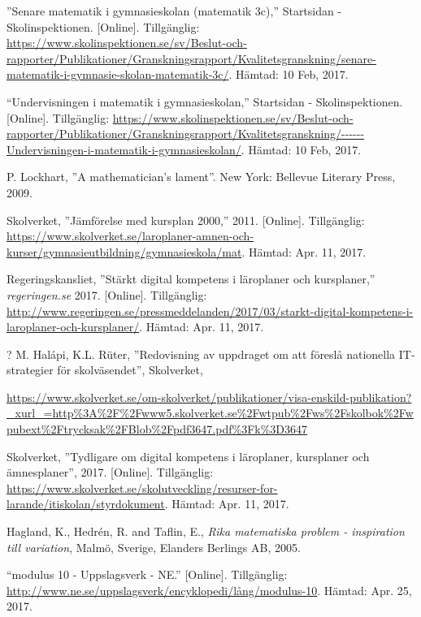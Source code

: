     ''Senare matematik i gymnasieskolan (matematik 3c),'' Startsidan - Skolinspektionen. [Online]. Tillgänglig: \url{https://www.skolinspektionen.se/sv/Beslut-och-rapporter/Publikationer/Granskningsrapport/Kvalitetsgranskning/senare-matematik-i-gymnasie-skolan-matematik-3c/}. Hämtad: 10 Feb, 2017.
    
    “Undervisningen i matematik i gymnasieskolan,” Startsidan - Skolinspektionen. [Online]. Tillgänglig: \url{https://www.skolinspektionen.se/sv/Beslut-och-rapporter/Publikationer/Granskningsrapport/Kvalitetsgranskning/------Undervisningen-i-matematik-i-gymnasieskolan/}. Hämtad: 10 Feb, 2017.
    
    P. Lockhart, ''A mathematician's lament''. New York: Bellevue Literary Press, 2009.
    
    Skolverket, ''Jämförelse med kursplan 2000,'' 2011. [Online]. Tillgänglig: \url{https://www.skolverket.se/laroplaner-amnen-och-kurser/gymnasieutbildning/gymnasieskola/mat}. Hämtad: Apr. 11, 2017.
    
    Regeringskansliet, ''Stärkt digital kompetens i läroplaner och kursplaner,'' \textsl{regeringen.se} 2017. [Online]. Tillgänglig: \url{http://www.regeringen.se/pressmeddelanden/2017/03/starkt-digital-kompetens-i-laroplaner-och-kursplaner/}. Hämtad: Apr. 11, 2017.
    
    ?
    M. Halápi, K.L. Rüter, ''Redovisning av uppdraget om att föreslå nationella IT-strategier för skolväsendet'', Skolverket,
    
    \url{https://www.skolverket.se/om-skolverket/publikationer/visa-enskild-publikation?_xurl_=http\%3A\%2F\%2Fwww5.skolverket.se\%2Fwtpub\%2Fws\%2Fskolbok\%2Fwpubext\%2Ftrycksak\%2FBlob\%2Fpdf3647.pdf\%3Fk\%3D3647}
    
   Skolverket, ''Tydligare om digital kompetens i läroplaner, kursplaner och ämnesplaner'', 2017. [Online]. Tillgänglig: \url{https://www.skolverket.se/skolutveckling/resurser-for-larande/itiskolan/styrdokument}. Hämtad: Apr. 11, 2017.
   
    Hagland, K., Hedrén, R. and Taflin, E., \textit{Rika matematiska problem - inspiration till variation}, Malmö, Sverige, Elanders Berlings AB, 2005.
    
    “modulus 10 - Uppslagsverk - NE.” [Online]. Tillgänglig: \url{http://www.ne.se/uppslagsverk/encyklopedi/lång/modulus-10}. 
    Hämtad: Apr. 25, 2017.
    
